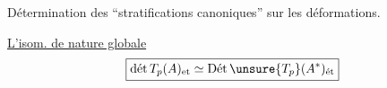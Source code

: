 
Détermination des ``stratifications canoniques'' sur les déformations.

\uline{L'isom. de nature globale}
\[
\boxed{\operatorname{\text{dét}} T_p(A)_{\mathrm{et}}\simeq\operatorname{\text{Dét}}\unsure{T_p}(A^*)_{\text{ét}}}
\]
